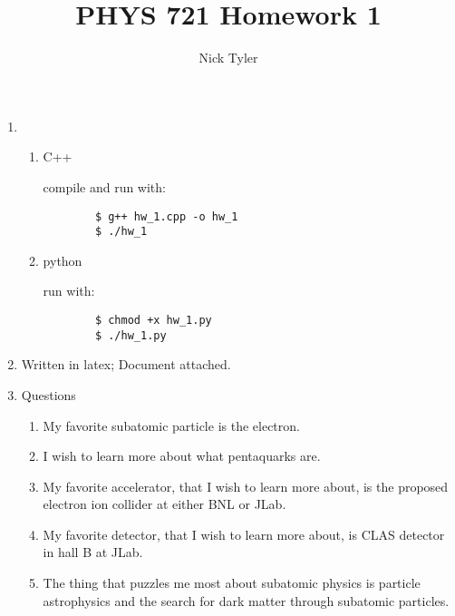 \documentclass[pdftex]{article}
\title{PHYS 721 Homework 1}
\author{Nick Tyler}
\date{}
\begin{document}
\maketitle
\begin{enumerate}
	\item 
	\begin{enumerate}
		\item C++
		
		compile and run with:
		\begin{verbatim}
		$ g++ hw_1.cpp -o hw_1
		$ ./hw_1
		\end{verbatim}

		\item python
		
		run with:
		\begin{verbatim}
		$ chmod +x hw_1.py
		$ ./hw_1.py
		\end{verbatim}
	\end{enumerate}
	\item Written in latex; Document attached.
	\item Questions
	\begin{enumerate}
		\item My favorite subatomic particle is the electron.
		\item I wish to learn more about what pentaquarks are.
		\item My favorite accelerator, that I wish to learn more about, is the proposed electron ion collider at either BNL or JLab.
		\item My favorite detector, that I wish to learn more about, is CLAS detector in hall B at JLab.
		\item The thing that puzzles me most about subatomic physics is particle astrophysics and the search for dark matter through subatomic particles.
	\end{enumerate}

\end{enumerate}
\end{document}
